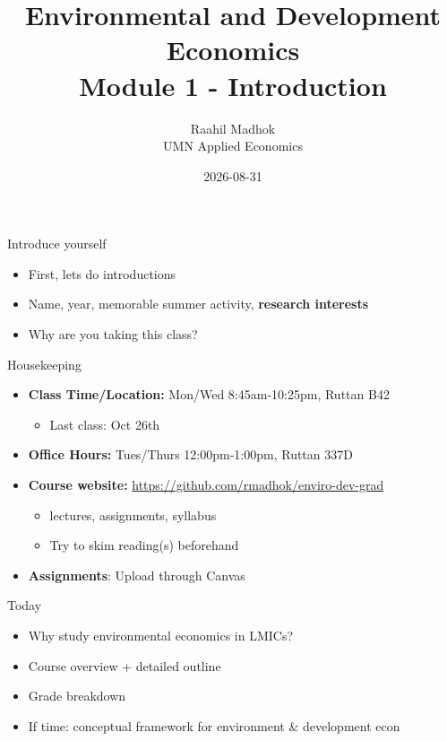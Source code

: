 \documentclass[
  ignorenonframetext,
  aspectratio=169]{beamer}
\title{Environmental and Development Economics\\
Module 1 - Introduction}
\author{Raahil Madhok\\
UMN Applied Economics}
\date{2026-08-31}
\providecommand{\tightlist}{%
  \setlength{\itemsep}{0pt}\setlength{\parskip}{0pt}}
\begin{document}
\frame{\titlepage}

\begin{frame}{Introduce yourself}
\protect\hypertarget{introduce-yourself}{}
\begin{itemize}
\item
  First, lets do introductions \vfill
\item
  Name, year, memorable summer activity, \textbf{research interests}
  \vfill
\item
  Why are you taking this class?
\end{itemize}
\end{frame}

\begin{frame}{Housekeeping}
\protect\hypertarget{housekeeping}{}
\begin{itemize}
\tightlist
\item
  \textbf{Class Time/Location:} Mon/Wed 8:45am-10:25pm, Ruttan B42

  \begin{itemize}
  \tightlist
  \item
    Last class: Oct 26th
  \end{itemize}
\end{itemize}

\vfill

\begin{itemize}
\tightlist
\item
  \textbf{Office Hours:} Tues/Thurs 12:00pm-1:00pm, Ruttan 337D \vfill
\item
  \textbf{Course website:}
  \url{https://github.com/rmadhok/enviro-dev-grad}

  \begin{itemize}
  \tightlist
  \item
    lectures, assignments, syllabus
  \item
    Try to skim reading(s) beforehand \vfill
  \end{itemize}
\item
  \textbf{Assignments}: Upload through Canvas \vfill
\end{itemize}
\end{frame}

\begin{frame}{Today}
\protect\hypertarget{today}{}
\begin{itemize}
\tightlist
\item
  Why study environmental economics in LMICs? \vfill
\item
  Course overview + detailed outline \vfill
\item
  Grade breakdown \vfill
\item
  If time: conceptual framework for environment \& development econ
\end{itemize}
\end{frame}
\end{document}
